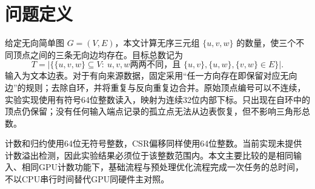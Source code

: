 \section{问题定义}
给定无向简单图 $G=(V,E)$，本文计算无序三元组 $\{u,v,w\}$ 的数量，使三个不同顶点之间的三条无向边均存在。目标总数记为
\[
T=\bigl|\{\{u,v,w\}\subseteq V:\ u,v,w\text{两两不同，且 }\{u,v\},\{u,w\},\{v,w\}\in E\}\bigr|.
\]
输入为文本边表。对于有向来源数据，固定采用“任一方向存在即保留对应无向边”的规则；去除自环，并将重复与反向重复边合并。原始顶点编号可以不连续，实验实现使用有符号64位整数读入，映射为连续32位内部下标。只出现在自环中的顶点仍保留；没有任何输入端点记录的孤立点无法从边表恢复，但不影响三角形总数。

计数和归约使用64位无符号整数，CSR偏移同样使用64位整数。当前实现未提供计数溢出检测，因此实验结果必须位于该整数范围内。本文主要比较的是相同输入、相同GPU计数功能下，基础流程与预处理优化流程完成一次任务的总时间，不以CPU串行时间替代GPU同硬件主对照。
